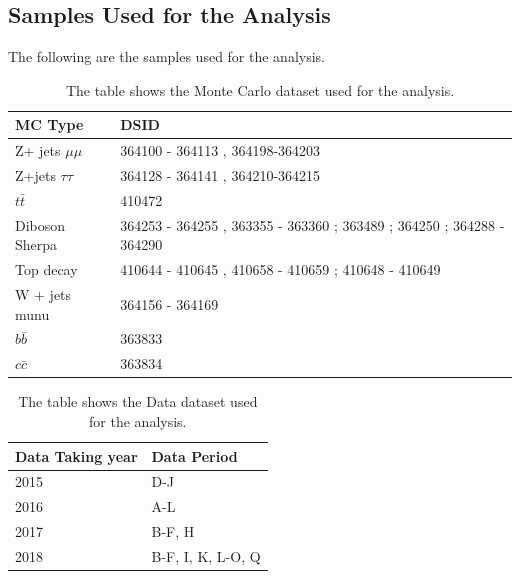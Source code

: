 \subsection{Samples Used for the Analysis}
The following are the samples used for the analysis.

\begin{table}[!htb]
    \begin{center}
    \caption{
        The table shows the Monte Carlo dataset used for the analysis. 
    }
\label{tab:MC samples}
\begin{tabular}{|l|l|}
\hline
\textbf{MC Type}   & \textbf{DSID}                                                         \\ \hline
Z+ jets $\mu\mu$   & 364100 - 364113 , 364198-364203                                       \\ \hline
Z+jets $\tau \tau$ & 364128 - 364141 , 364210-364215                                       \\ \hline
$t\bar{t}$         & 410472                                                                \\ \hline
Diboson Sherpa     & 364253 - 364255 , 363355 - 363360 ; 363489 ; 364250 ; 364288 - 364290 \\ \hline
Top decay          & 410644 - 410645 , 410658 - 410659 ; 410648 - 410649                   \\ \hline
W + jets munu      & 364156 - 364169                                                       \\ \hline
$b\bar{b}$         & 363833                                                                \\ \hline
$c\bar{c}$         & 363834                                                                \\ \hline
\end{tabular}
\end{center}
\end{table}


\begin{table}[!htb]
    \begin{center}
    \caption{
        The table shows the Data dataset used for the analysis. 
    }
\label{tab:MC samples}
\begin{tabular}{|l|l|}
\hline
\textbf{Data Taking year}   & \textbf{Data Period}                                                         \\ \hline
2015   & D-J                                       \\ \hline
2016   & A-L                                       \\ \hline
2017   & B-F, H                                                           \\ \hline
2018   & B-F, I, K, L-O, Q                          \\ \hline
\end{tabular}
\end{center}
\end{table}


